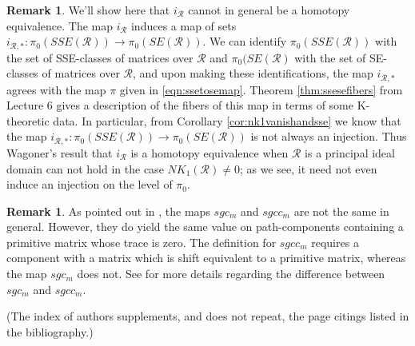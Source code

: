 \documentclass{amsart}
\newcommand{\ai}{\index[authors]}
\theoremstyle{definition}
\newtheorem{rem}[equation]{Remark}
\theoremstyle{definition}
\newcommand{\calR}{\mathcal{R}}
\numberwithin{equation}{subsection}
\begin{document}
\begin{rem}\label{apprem:nothomeqingeneral}
We'll show here that $i_{\calR}$ cannot in general be a homotopy equivalence. The map $i_{\calR}$ induces a map of sets $i_{\calR,*} \colon \pi_{0}(SSE(\calR)) \to \pi_{0}(SE(\calR))$. We can identify $\pi_{0}(SSE(\calR))$ with the set of SSE-classes of matrices over $\calR$ and $\pi_{0}(SE(\calR)$ with the set of SE-classes of matrices over $\calR$, and upon making these identifications, the map $i_{\calR,*}$ agrees with the map $\pi$ given in \eqref{eqn:ssetosemap}. Theorem \ref{thm:ssesefibers} from Lecture 6 gives a description of the fibers of this map in terms of some K-theoretic data. In particular, from Corollary \ref{cor:nk1vanishandsse} we know that the map $i_{\calR,*} \colon \pi_{0}(SSE(\calR)) \to \pi_{0}(SE(\calR))$ is not always an injection. Thus Wagoner's\ai{Wagoner, J.B.} result that $i_{\calR}$ is a homotopy equivalence when $\calR$ is a principal ideal domain can not hold in the case $NK_{1}(\calR) \ne 0$; as we see, it need not even induce an injection on the level of $\pi_{0}$.
\end{rem}

\begin{rem}\label{apprem:sgcvssgcc}
As pointed out in \cite[Section 8]{S11}, the maps $sgc_{m}$ and $sgcc_{m}$ are not the same in general. However, they do yield the same value on path-components containing a primitive matrix whose trace is zero. The definition for $sgcc_{m}$ requires a component with a matrix which is shift equivalent to a primitive matrix, whereas the map $sgc_{m}$ does not. See \cite[Section 8]{S11} for more details regarding the difference between $sgc_{m}$ and $sgcc_{m}$.
\end{rem}







\printindex %

\printindex[authors]

(The index of authors supplements, and does not repeat, the
  page citings listed in the bibliography.)

\end{document}
